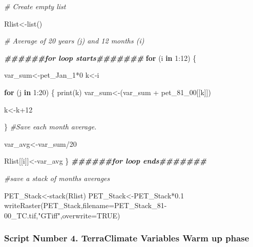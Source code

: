 \documentclass[
  10pt,
  b5paper,
]{book}
\newenvironment{Shaded}{\begin{snugshade}}{\end{snugshade}}
\newcommand{\AttributeTok}[1]{\textcolor[rgb]{0.77,0.63,0.00}{#1}}
\newcommand{\CommentTok}[1]{\textcolor[rgb]{0.56,0.35,0.01}{\textit{#1}}}
\newcommand{\ConstantTok}[1]{\textcolor[rgb]{0.00,0.00,0.00}{#1}}
\newcommand{\ControlFlowTok}[1]{\textcolor[rgb]{0.13,0.29,0.53}{\textbf{#1}}}
\newcommand{\DecValTok}[1]{\textcolor[rgb]{0.00,0.00,0.81}{#1}}
\newcommand{\DocumentationTok}[1]{\textcolor[rgb]{0.56,0.35,0.01}{\textbf{\textit{#1}}}}
\newcommand{\FloatTok}[1]{\textcolor[rgb]{0.00,0.00,0.81}{#1}}
\newcommand{\FunctionTok}[1]{\textcolor[rgb]{0.00,0.00,0.00}{#1}}
\newcommand{\NormalTok}[1]{#1}
\newcommand{\OtherTok}[1]{\textcolor[rgb]{0.56,0.35,0.01}{#1}}
\newcommand{\SpecialCharTok}[1]{\textcolor[rgb]{0.00,0.00,0.00}{#1}}
\newcommand{\StringTok}[1]{\textcolor[rgb]{0.31,0.60,0.02}{#1}}
\begin{document}
\begin{Shaded}
\begin{Highlighting}[]
\CommentTok{\# Create empty list}

\NormalTok{Rlist}\OtherTok{\textless{}{-}}\FunctionTok{list}\NormalTok{()}

\CommentTok{\# Average of 20 years (j)  and 12 months (i) }

\DocumentationTok{\#\#\#\#\#\#for loop starts\#\#\#\#\#\#\#}
\ControlFlowTok{for}\NormalTok{ (i }\ControlFlowTok{in} \DecValTok{1}\SpecialCharTok{:}\DecValTok{12}\NormalTok{) \{ }

\NormalTok{var\_sum}\OtherTok{\textless{}{-}}\NormalTok{pet\_Jan\_1}\SpecialCharTok{*}\DecValTok{0}
\NormalTok{k}\OtherTok{\textless{}{-}}\NormalTok{i}

\ControlFlowTok{for}\NormalTok{ (j }\ControlFlowTok{in} \DecValTok{1}\SpecialCharTok{:}\DecValTok{20}\NormalTok{) \{}
\FunctionTok{print}\NormalTok{(k)}
\NormalTok{var\_sum}\OtherTok{\textless{}{-}}\NormalTok{(var\_sum }\SpecialCharTok{+}\NormalTok{ pet\_81\_00[[k]])}

\NormalTok{k}\OtherTok{\textless{}{-}}\NormalTok{k}\SpecialCharTok{+}\DecValTok{12}

\NormalTok{\}}
\CommentTok{\#Save each month average. }

\NormalTok{var\_avg}\OtherTok{\textless{}{-}}\NormalTok{var\_sum}\SpecialCharTok{/}\DecValTok{20}


\NormalTok{Rlist[[i]]}\OtherTok{\textless{}{-}}\NormalTok{var\_avg}
\NormalTok{\}}
\DocumentationTok{\#\#\#\#\#\#for loop ends\#\#\#\#\#\#\#}

\CommentTok{\#save a stack of months averages}

\NormalTok{PET\_Stack}\OtherTok{\textless{}{-}}\FunctionTok{stack}\NormalTok{(Rlist)}
\NormalTok{PET\_Stack}\OtherTok{\textless{}{-}}\NormalTok{PET\_Stack}\SpecialCharTok{*}\FloatTok{0.1}
\FunctionTok{writeRaster}\NormalTok{(PET\_Stack,}\AttributeTok{filename=}\StringTok{\textquotesingle{}PET\_Stack\_81{-}00\_TC.tif\textquotesingle{}}\NormalTok{,}\StringTok{"GTiff"}\NormalTok{,}\AttributeTok{overwrite=}\ConstantTok{TRUE}\NormalTok{)}
\end{Highlighting}
\end{Shaded}

\hypertarget{script-number-4.-terraclimate-variables-warm-up-phase}{%
\subsubsection{Script Number 4. TerraClimate Variables Warm up phase}\label{script-number-4.-terraclimate-variables-warm-up-phase}}
\end{document}
